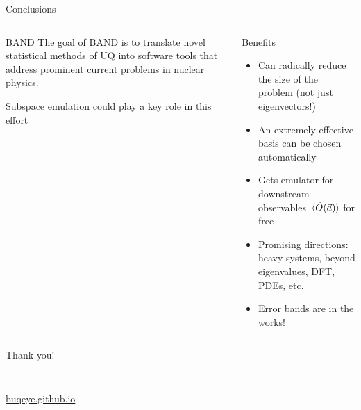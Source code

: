 \documentclass[xcolor=dvipsnames, aspectratio=169]{beamer}
\begin{document}
\begin{frame}{Conclusions}

\begin{columns}[t]
\begin{column}{0.4\textwidth}
\begin{myblock}[valign=center]{BAND}
The goal of BAND is to translate novel statistical methods of UQ into
software tools that address prominent current problems in nuclear physics.
\end{myblock}
Subspace emulation could play a key role in this effort
\end{column}
\begin{column}{0.6\textwidth}
\begin{myblock}[valign=center]{Benefits}
\setlength\leftmargini{0pt}
\begin{itemize}
\item Can radically reduce the size of the problem (not just \alert{eigenvectors}!)
\item An extremely effective basis can be chosen \alert{automatically}
\item Gets emulator for downstream observables $\ev*{\hat O(\lecs)}$ \alert{for free}
\end{itemize}
\end{myblock}
\begin{itemize}
\item Promising directions: heavy systems, beyond eigenvalues, DFT, PDEs, etc.
\item Error bands are in the works!
\end{itemize}
\end{column}
\end{columns}
\end{frame}



\appendix

\begin{frame}[standout,t]

\vspace{.2in}

Thank you!
\noindent\rule{\textwidth}{1pt}


\begin{columns}
\begin{column}{0.5\textwidth}
\begin{center}
\href{https://buqeye.github.io/}{\alert{buqeye.github.io}}
\end{center}
\end{column}
\end{columns}
\end{frame}
\end{document}
